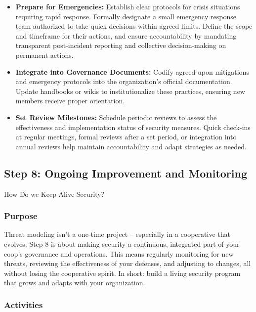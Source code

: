 \begin{itemize}
    \item \textbf{Prepare for Emergencies:} Establish clear protocols for crisis
    situations requiring rapid response. Formally designate a small emergency
    response team authorized to take quick decisions within agreed limits. Define
    the scope and timeframe for their actions, and ensure accountability by
    mandating transparent post-incident reporting and collective decision-making on
    permanent actions.
    
    \item \textbf{Integrate into Governance Documents:} Codify agreed-upon
    mitigations and emergency protocols into the organization's official
    documentation. Update handbooks or wikis to institutionalize these practices,
    ensuring new members receive proper orientation.
    
    \item \textbf{Set Review Milestones:} Schedule periodic reviews to assess the
    effectiveness and implementation status of security measures. Quick check-ins at
    regular meetings, formal reviews after a set period, or integration into annual
    reviews help maintain accountability and adapt strategies as needed.
    
\end{itemize}

\subsection{Step 8: Ongoing Improvement and Monitoring}
\label{subsec:Step8}

How Do we Keep Alive Security?

\subsubsection{Purpose}

Threat modeling isn't a one-time project – especially in a cooperative that
evolves. Step 8 is about making security a continuous, integrated part of your
coop's governance and operations. This means regularly monitoring for new
threats, reviewing the effectiveness of your defenses, and adjusting to changes,
all without losing the cooperative spirit. In short: build a living security
program that grows and adapts with your organization.

\subsubsection{Activities}

